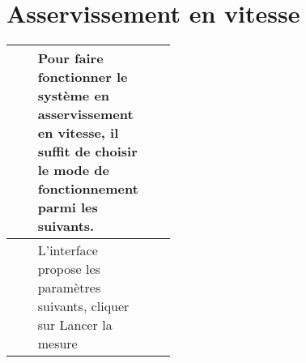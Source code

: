 \section{Asservissement en vitesse}

\begin{tabular}{|Ep{0.4\linewidth}|p{.5\linewidth}|}
\hline
& Pour faire fonctionner le système en asservissement en vitesse, il suffit de choisir le mode de fonctionnement parmi les suivants.
&\tabularnewline\hline
& L'interface propose les paramètres suivants, cliquer sur Lancer la mesure
&\tabularnewline\hline

\end{tabular}


